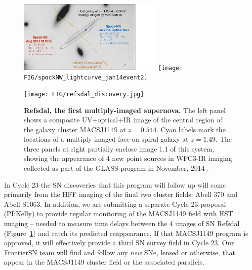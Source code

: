 \documentclass[12pt]{article}
\begin{document}
\begin{figure}
\vspace{-15mm}
\begin{center}
\includegraphics[width=0.63\textwidth]{FIG/spock_summary}
\texttt{[image: FIG/spockNW\_lightcurve\_jan14event2]}
\caption{ \label{fig:spock} %
{\bf Spock, a peculiar pair of events.}  {\it(Left)} A template
\HST\ image in the F814W band showing the locations of two transient
sources (nicknamed ``Spock-SE'' and ``Spock-NW'') that separately
appeared in adjacent images of a strongly-lensed galaxy at $z=1.0$
behind the Frontier Field cluster MACSJ0416. Lens models indicate that
a critical curve passes roughly mid-way between them, and they are
magnified by $\mu\sim20-30$ (3-4 mags).  {\it(Right)} The light curve
of the Spock-NW event was captured in high-cadence HST-ACS imaging,
and the entire episode lasted only $\sim3$ rest-frame days. 
}
\vspace{3mm}
\texttt{[image: FIG/refsdal\_discovery.jpg]}
 \caption{ %
 {\bf Refsdal, the first multiply-imaged supernova.}
   The left panel shows a composite UV+optical+IR image of the central
   region of the galaxy cluster MACSJ1149 at $z=0.544$.  Cyan labels
   mark the locations of a multiply imaged face-on spiral galaxy at
   $z=1.49$.  The three panels at right partially enclose image 1.1 of
   this system, showing the appearance of 4 new point sources in
   WFC3-IR imaging collected as part of the GLASS program in November,
   2014 \citep{Kelly:2015}.
\label{fig:refsdal}  }
\end{center}
\end{figure}




%
%
\describeobservations   %

In Cycle 23 the SN discoveries that this program will follow up will
come primarily from the HFF imaging of the final two cluster fields:
Abell 370 and Abell S1063. In addition, we are submitting a separate
Cycle 23 proposal (PI:Kelly) to provide regular monitoring of the
MACSJ1149 field with HST imaging -- needed to
measure time delays between the 4 images of SN Refsdal
(Figure~\ref{fig:refsdal}) and catch its predicted reappearance.  If
that MACSJ1149 program is approved, it will effectively provide a
third SN survey field in Cycle 23. Our FrontierSN team will find
and follow any {\it new} SNe, lensed or otherwise, that appear in the
MACSJ1149 cluster field or the associated parallels.  
\end{document}
